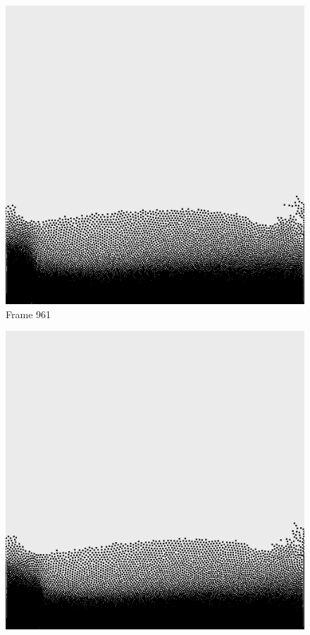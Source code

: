 \documentclass[a4paper, 12pt, oneside]{book}
\begin{document}
\begin{figure}[!ht]
    \addvspace{0.5ex}
        \begin{center}
            \includegraphics[width=\linewidth]{images/test_case_2/961.png}
            Frame 961
        \end{center}
    \endminipage
    \hfill
        \begin{center}
            \includegraphics[width=\linewidth]{images/test_case_2/981.png}

\end{center}
\end{figure}
\end{document}
